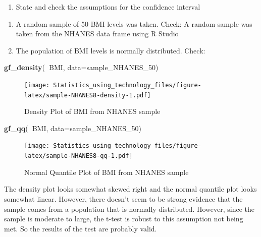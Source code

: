 \documentclass[]{book}
\newenvironment{Shaded}{\begin{snugshade}}{\end{snugshade}}
\newcommand{\DataTypeTok}[1]{\textcolor[rgb]{0.13,0.29,0.53}{#1}}
\newcommand{\DecValTok}[1]{\textcolor[rgb]{0.00,0.00,0.81}{#1}}
\newcommand{\KeywordTok}[1]{\textcolor[rgb]{0.13,0.29,0.53}{\textbf{#1}}}
\newcommand{\NormalTok}[1]{#1}
\newcommand{\OperatorTok}[1]{\textcolor[rgb]{0.81,0.36,0.00}{\textbf{#1}}}
\providecommand{\tightlist}{%
  \setlength{\itemsep}{0pt}\setlength{\parskip}{0pt}}
\begin{document}
\begin{enumerate}
\def\labelenumi{\arabic{enumi}.}
\setcounter{enumi}{1}
\tightlist
\item
  State and check the assumptions for the confidence interval
\end{enumerate}

\begin{enumerate}
\def\labelenumi{\alph{enumi}.}
\item
  A random sample of 50 BMI levels was taken. Check: A random sample was taken from the NHANES data frame using R Studio
\item
  The population of BMI levels is normally distributed. Check:
\end{enumerate}



\begin{Shaded}
\begin{Highlighting}[]
\KeywordTok{gf_density}\NormalTok{(}\OperatorTok{~}\NormalTok{BMI, }\DataTypeTok{data=}\NormalTok{sample_NHANES_}\DecValTok{50}\NormalTok{)}
\end{Highlighting}
\end{Shaded}

\begin{figure}
\centering
\texttt{[image: Statistics\_using\_technology\_files/figure-latex/sample-NHANES8-density-1.pdf]}
\caption{\label{fig:sample-NHANES8-density}Density Plot of BMI from NHANES sample}
\end{figure}



\begin{Shaded}
\begin{Highlighting}[]
\KeywordTok{gf_qq}\NormalTok{(}\OperatorTok{~}\NormalTok{BMI, }\DataTypeTok{data=}\NormalTok{sample_NHANES_}\DecValTok{50}\NormalTok{)}
\end{Highlighting}
\end{Shaded}

\begin{figure}
\centering
\texttt{[image: Statistics\_using\_technology\_files/figure-latex/sample-NHANES8-qq-1.pdf]}
\caption{\label{fig:sample-NHANES8-qq}Normal Quantile Plot of BMI from NHANES sample}
\end{figure}

The density plot looks somewhat skewed right and the normal quantile plot looks somewhat linear. However, there doesn't seem to be strong evidence that the sample comes from a population that is normally distributed. However, since the sample is moderate to large, the t-test is robust to this assumption not being met. So the results of the test are probably valid.
\end{document}
